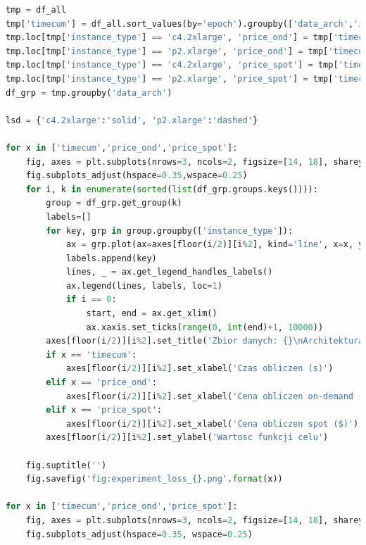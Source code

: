 \documentclass[12pt,a4paper,twoside]{article}
\begin{document}
\begin{appendices}
\begin{lstlisting}[language=python]
tmp = df_all
tmp['timecum'] = df_all.sort_values(by='epoch').groupby(['data_arch','instance_type']).cumsum()['time']
tmp.loc[tmp['instance_type'] == 'c4.2xlarge', 'price_ond'] = tmp['timecum']*0.3980/3600
tmp.loc[tmp['instance_type'] == 'p2.xlarge', 'price_ond'] = tmp['timecum']*0.9000/3600
tmp.loc[tmp['instance_type'] == 'c4.2xlarge', 'price_spot'] = tmp['timecum']*0.1092/3600
tmp.loc[tmp['instance_type'] == 'p2.xlarge', 'price_spot'] = tmp['timecum']*0.2450/3600
df_grp = tmp.groupby('data_arch')

lsd = {'c4.2xlarge':'solid', 'p2.xlarge':'dashed'}

for x in ['timecum','price_ond','price_spot']:
    fig, axes = plt.subplots(nrows=3, ncols=2, figsize=[14, 18], sharey=False)
    fig.subplots_adjust(hspace=0.35,wspace=0.25)
    for i, k in enumerate(sorted(list(df_grp.groups.keys()))):
        group = df_grp.get_group(k)
        labels=[]
        for key, grp in group.groupby(['instance_type']):
            ax = grp.plot(ax=axes[floor(i/2)][i%2], kind='line', x=x, y='loss', c='black', ls=lsd.get(key))
            labels.append(key)
            lines, _ = ax.get_legend_handles_labels()
            ax.legend(lines, labels, loc=1)
            if i == 0:
                start, end = ax.get_xlim()
                ax.xaxis.set_ticks(range(0, int(end)+1, 10000))
        axes[floor(i/2)][i%2].set_title('Zbior danych: {}\nArchitektura: {}'.format(k.split('_')[0], k.split('_')[1]))
        if x == 'timecum':
            axes[floor(i/2)][i%2].set_xlabel('Czas obliczen (s)')
        elif x == 'price_ond':
            axes[floor(i/2)][i%2].set_xlabel('Cena obliczen on-demand ($)')
        elif x == 'price_spot':
            axes[floor(i/2)][i%2].set_xlabel('Cena obliczen spot ($)')
        axes[floor(i/2)][i%2].set_ylabel('Wartosc funkcji celu')

    fig.suptitle('')
    fig.savefig('fig:experiment_loss_{}.png'.format(x))

for x in ['timecum','price_ond','price_spot']:
    fig, axes = plt.subplots(nrows=3, ncols=2, figsize=[14, 18], sharey=False)
    fig.subplots_adjust(hspace=0.35, wspace=0.25)


\end{lstlisting}
\end{appendices}
\end{document}

